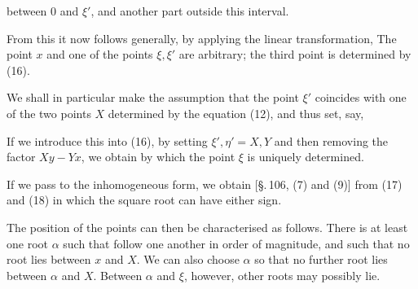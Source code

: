 between $0$ and $\xi'$, and another part outside this interval.

From this it now follows generally, by applying the linear transformation,  The point $x$ and one of the points $\xi, \xi'$ are arbitrary; the third point is determined by (16).

We shall in particular make the assumption that the point $\xi'$ coincides with one of the two points $X$ determined by the equation (12), and thus set, say,

If we introduce this into (16), by setting $\xi', \eta' = X, Y$ and then removing the factor $Xy - Yx$, we obtain
by which the point $\xi$ is uniquely determined.

If we pass to the inhomogeneous form, we obtain [\S.\,106, (7) and (9)] from (17) and (18)
in which the square root can have either sign.

The position of the points can then be characterised as follows. There is at least one root $\alpha$ such that
follow one another in order of magnitude, and such that no root lies between $x$ and $X$. We can also choose $\alpha$ so that no further root lies between $\alpha$ and $X$. Between $\alpha$ and $\xi$, however, other roots may possibly lie.
